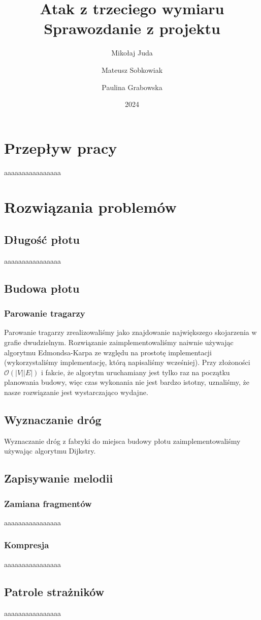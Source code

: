 \documentclass{article}
\title{Atak z trzeciego wymiaru \\\large Sprawozdanie z projektu}
\author{Mikołaj Juda \and Mateusz Sobkowiak \and Paulina Grabowska}
\date{2024}
\begin{document}
\maketitle
\section{Przepływ pracy}
aaaaaaaaaaaaaaaa
\section{Rozwiązania problemów}
\subsection{Długość płotu}
aaaaaaaaaaaaaaaa
\subsection{Budowa płotu}
\subsubsection{Parowanie tragarzy}
Parowanie tragarzy zrealizowaliśmy jako znajdowanie największego skojarzenia w grafie dwudzielnym.
Rozwiązanie zaimplementowaliśmy naiwnie używając algorytmu Edmondsa-Karpa ze względu na prostotę implementacji
(wykorzystaliśmy implementację, którą napisaliśmy wcześniej). Przy złożoności \(\mathcal{O}(|V||E|)\)\cite{cs6820matchingnotes}
i fakcie, że algorytm uruchamiany jest tylko raz na początku planowania budowy, więc czas wykonania nie jest bardzo istotny,
uznaliśmy, że nasze rozwiązanie jest wystarczająco wydajne.
\subsection{Wyznaczanie dróg}
Wyznaczanie dróg z fabryki do miejsca budowy płotu zaimplementowaliśmy używając algorytmu Dijkstry.
\subsection{Zapisywanie melodii}
\subsubsection{Zamiana fragmentów}
aaaaaaaaaaaaaaaa
\subsubsection{Kompresja}
aaaaaaaaaaaaaaaa
\subsection{Patrole strażników}
aaaaaaaaaaaaaaaa
\printbibliography[heading=bibintoc]
\end{document}
